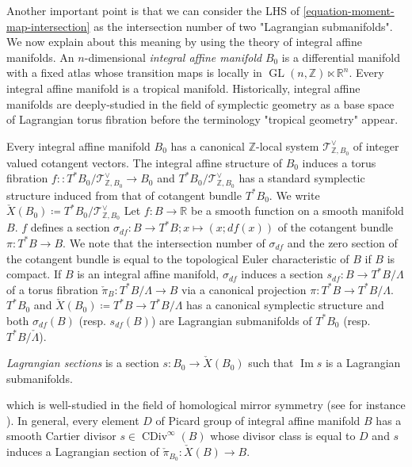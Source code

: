 \documentclass[a4paper,dvipdfmx,reqno,12pt]{amsart}
\theoremstyle{definition}
\newcommand{\deq}{\coloneqq}
\newcommand{\opn}[1]{\operatorname{#1}}
\numberwithin{equation}{section}
\begin{document}


Another important point is that 
we can consider the LHS of 
\cref{equation-moment-map-intersection}
as the intersection number 
of two "Lagrangian submanifolds".
We now explain about this meaning by
using the theory of integral affine manifolds.
An $n$-dimensional 
\emph{integral affine manifold} $B_0$ 
is a differential manifold 
with a fixed atlas whose transition maps is locally in 
$\opn{GL}(n,\mathbb{Z})\ltimes \mathbb{R}^{n}$.
Every integral affine manifold is a tropical manifold.
Historically, integral affine manifolds are 
deeply-studied in the field of symplectic geometry 
as a base space of Lagrangian torus fibration before
the terminology "tropical geometry" appear.

Every integral affine manifold $B_0$ has 
a canonical $\mathbb{Z}$-local system 
$\mathcal{T}^{\vee}_{\mathbb{Z},B_0}$ of integer
valued cotangent vectors. 
The integral affine structure of $B_0$ induces a
torus fibration 
$f\colon \colon T^{*}B_0/\mathcal{T}^{\vee}_{\mathbb{Z},B_0}
\to B_0$ and 
$T^{*}B_0/\mathcal{T}^{\vee}_{\mathbb{Z},B_0}$ has 
a standard symplectic structure induced from that of 
cotangent bundle $T^{*}B_0$.
We write $\check{X}(B_0)\deq 
T^{*}B_0/\mathcal{T}^{\vee}_{\mathbb{Z},B_0}$
Let $f\colon B\to \mathbb{R}$ be a 
smooth function on a smooth manifold $B$.
$f$ defines a section 
$\sigma_{df}\colon B\to T^{*}B; x\mapsto (x;df(x))$ of 
the cotangent bundle $\pi\colon T^{*}B\to B$.
We note that the intersection number of 
$\sigma_{df}$ and the zero section of the cotangent
bundle is equal to the topological Euler characteristic
of $B$ if $B$ is compact.
If $B$ is an integral affine manifold,
$\sigma_{df}$ induces a section 
$s_{df}\colon B\to T^*B/\Lambda$ of a torus fibration
$\check{\pi}_B\colon T^*B/\Lambda \to B$ via a canonical 
projection $\pi \colon T^*B\to T^*B/\Lambda$.
$T^{*}B_0$ and $\check{X}(B_0)\deq T^*B\to T^*B/\Lambda$
has a canonical symplectic structure and
both $\sigma_{df}(B)$ (resp. $s_{df}(B)$) are Lagrangian 
submanifolds of $T^{*}B_0$ 
(resp. $T^*B/\check{\Lambda}$).

\emph{Lagrangian sections} is a section 
$s\colon B_0\to \check{X}(B_0)$ such that 
$\opn{Im} s$ is a Lagrangian submanifolds.

which is well-studied in the field of homological 
mirror symmetry 
(see for instance \cite{MR1882331}).
In general, every element $D$ of Picard group of 
integral affine manifold $B$ has a smooth Cartier
divisor $s\in \opn{CDiv}^{\infty}(B)$ whose divisor 
class is equal to $D$ and 
$s$ induces a Lagrangian section of 
$\check{\pi}_{B_0}\colon \check{X}(B)\to B$.
\end{document}
